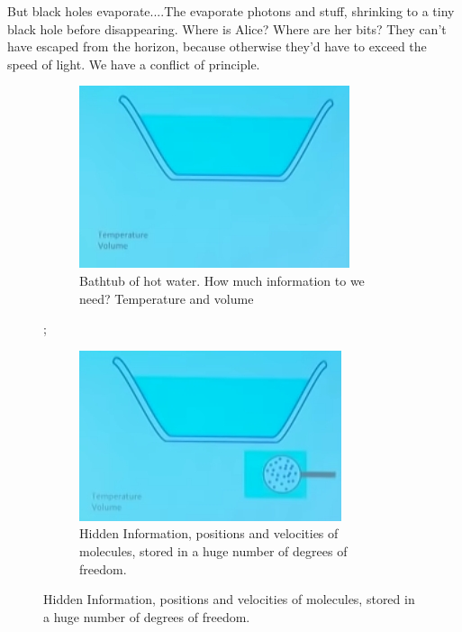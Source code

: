 \documentclass[]{article}
\begin{document}
But black holes evaporate....The evaporate photons and stuff, shrinking to a tiny black hole before disappearing. Where is Alice? Where are her bits? They can't have escaped from the horizon, because otherwise they'd have to exceed the speed of light. We have a conflict of principle.

\begin{figure}[H]
	\caption{Entropy--Information that is hidden.}
	\begin{subfigure}[t]{0.45\textwidth}
		\caption{Bathtub of hot water. How much information to we need? Temperature and volume}
		\includegraphics[width=\textwidth]{wh-bathtub}
	\end{subfigure}
	;\
	\begin{subfigure}[t]{0.45\textwidth}
		\caption{Hidden Information, positions and velocities of molecules, stored in a huge number of degrees of freedom.}
		\includegraphics[width=\textwidth]{wh-bathtub-detail}
	\end{subfigure}
\end{figure}
\end{document}
